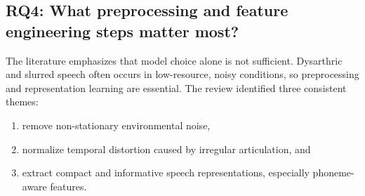 \documentclass{article}
\begin{document}
\subsection*{RQ4: What preprocessing and feature engineering steps matter most?}

The literature emphasizes that model choice alone is not sufficient. Dysarthric and slurred speech often occurs in low-resource, noisy conditions, so preprocessing and representation learning are essential. The review identified three consistent themes:
\begin{enumerate}
    \item remove non-stationary environmental noise,
    \item normalize temporal distortion caused by irregular articulation, and
    \item extract compact and informative speech representations, especially phoneme-aware features.
\end{enumerate}
\end{document}
